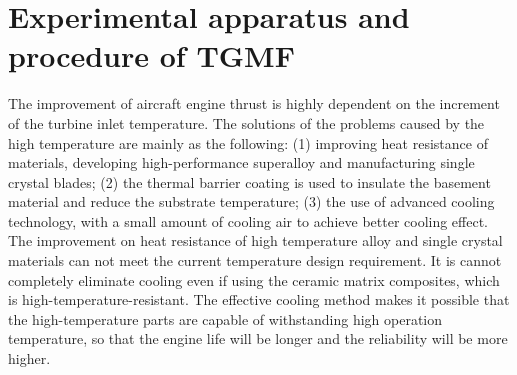 \chapter{Experimental apparatus and procedure of TGMF}
The improvement of aircraft engine thrust is highly dependent on the increment of the turbine inlet temperature.
The solutions of the problems caused by the high temperature are mainly as the following:
(1) improving heat resistance of materials, developing high-performance superalloy and manufacturing single crystal blades;
(2) the thermal barrier coating is used to insulate the basement material and reduce the substrate temperature;
(3) the use of advanced cooling technology, with a small amount of cooling air to achieve better cooling effect.
The improvement on heat resistance of high temperature alloy and single crystal materials can not meet the current temperature design requirement. It is cannot completely eliminate cooling even if using the ceramic matrix composites, which is high-temperature-resistant. The effective cooling method makes it possible that the high-temperature parts are capable of withstanding high operation temperature, so that the engine life will be longer and the reliability will be more higher.


